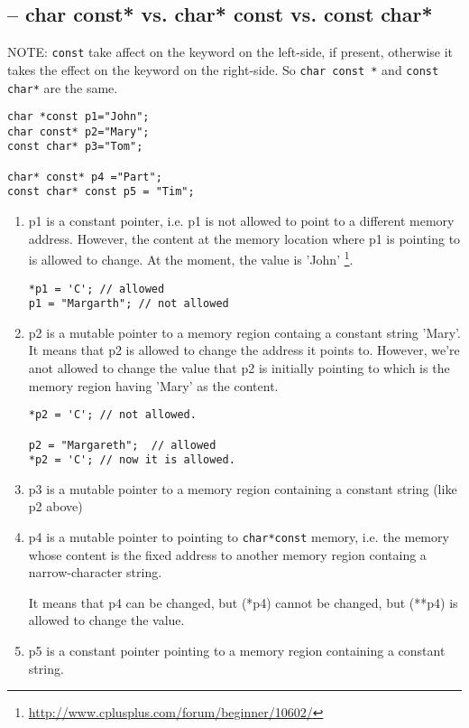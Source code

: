 \subsection{-- char const* vs. char* const vs. const char*}
\label{sec:const_char}

NOTE: \verb!const! take affect on the keyword on the left-side, if present,
otherwise it takes the effect on the keyword on the right-side. So
\verb!char const *! and \verb!const char*! are the same. 
\begin{verbatim}
char *const p1="John";
char const* p2="Mary";
const char* p3="Tom";

char* const* p4 ="Part";
const char* const p5 = "Tim"; 
\end{verbatim}

\begin{enumerate}
  \item p1 is a constant pointer, i.e. p1 is not allowed to point to a different memory
address. However, the content at the memory location where p1 is pointing to is
allowed to change. At the  moment, the value is 'John'
\footnote{\url{http://www.cplusplus.com/forum/beginner/10602/}}.
\begin{verbatim}
*p1 = 'C'; // allowed
p1 = "Margarth"; // not allowed 
\end{verbatim}

  \item p2 is a mutable pointer to a memory region containg a constant string
  'Mary'.
  It means that p2 is allowed to change the address it points to. However, we're anot allowed to change the value
that p2 is initially pointing to which is the memory region having 'Mary' as
the content.
\begin{verbatim}
*p2 = 'C'; // not allowed.

p2 = "Margareth";  // allowed
*p2 = 'C'; // now it is allowed.
\end{verbatim}

  \item p3 is a mutable pointer to a memory region containing a constant string
  (like p2 above)

  \item p4 is a mutable pointer to pointing to \verb!char*const! memory, i.e. 
  the memory whose content is the fixed address to another memory region
  containg a narrow-character string.
  
It means that p4 can be changed, but (*p4) cannot be
changed, but (**p4) is allowed to change the value.

 \item p5 is a constant pointer pointing to a memory region containing a
 constant string.

\end{enumerate}

